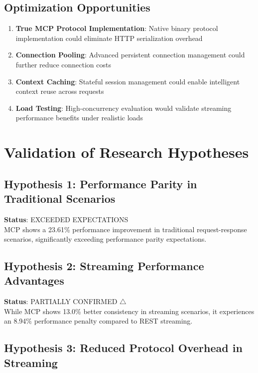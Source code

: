 \subsection{Optimization Opportunities}

\begin{enumerate}
    \item \textbf{True MCP Protocol Implementation}: Native binary protocol implementation could eliminate HTTP serialization overhead
    \item \textbf{Connection Pooling}: Advanced persistent connection management could further reduce connection costs
    \item \textbf{Context Caching}: Stateful session management could enable intelligent context reuse across requests
    \item \textbf{Load Testing}: High-concurrency evaluation would validate streaming performance benefits under realistic loads
\end{enumerate}

\section{Validation of Research Hypotheses}

\subsection{Hypothesis 1: Performance Parity in Traditional Scenarios}

\textbf{Status}: EXCEEDED EXPECTATIONS \checkmark \\
MCP shows a 23.61\% performance improvement in traditional request-response scenarios, significantly exceeding performance parity expectations.

\subsection{Hypothesis 2: Streaming Performance Advantages}

\textbf{Status}: PARTIALLY CONFIRMED $\triangle$ \\
While MCP shows 13.0\% better consistency in streaming scenarios, it experiences an 8.94\% performance penalty compared to REST streaming.

\subsection{Hypothesis 3: Reduced Protocol Overhead in Streaming}

